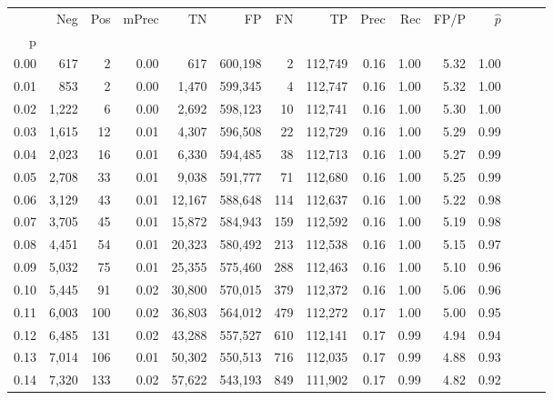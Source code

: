 \begin{tabular}{rrrrrrrrrrrrrrr}
\toprule
{} &     Neg &    Pos & mPrec &       TN &       FP &       FN &       TP &  Prec &   Rec &  FP/P & $\hat{p}$ \\
p    &         &        &       &          &          &          &          &       &       &       &           \\
\midrule
0.00 &     617 &      2 &  0.00 &      617 &  600,198 &        2 &  112,749 &  0.16 &  1.00 &  5.32 &      1.00 \\
0.01 &     853 &      2 &  0.00 &    1,470 &  599,345 &        4 &  112,747 &  0.16 &  1.00 &  5.32 &      1.00 \\
0.02 &   1,222 &      6 &  0.00 &    2,692 &  598,123 &       10 &  112,741 &  0.16 &  1.00 &  5.30 &      1.00 \\
0.03 &   1,615 &     12 &  0.01 &    4,307 &  596,508 &       22 &  112,729 &  0.16 &  1.00 &  5.29 &      0.99 \\
0.04 &   2,023 &     16 &  0.01 &    6,330 &  594,485 &       38 &  112,713 &  0.16 &  1.00 &  5.27 &      0.99 \\
0.05 &   2,708 &     33 &  0.01 &    9,038 &  591,777 &       71 &  112,680 &  0.16 &  1.00 &  5.25 &      0.99 \\
0.06 &   3,129 &     43 &  0.01 &   12,167 &  588,648 &      114 &  112,637 &  0.16 &  1.00 &  5.22 &      0.98 \\
0.07 &   3,705 &     45 &  0.01 &   15,872 &  584,943 &      159 &  112,592 &  0.16 &  1.00 &  5.19 &      0.98 \\
0.08 &   4,451 &     54 &  0.01 &   20,323 &  580,492 &      213 &  112,538 &  0.16 &  1.00 &  5.15 &      0.97 \\
0.09 &   5,032 &     75 &  0.01 &   25,355 &  575,460 &      288 &  112,463 &  0.16 &  1.00 &  5.10 &      0.96 \\
0.10 &   5,445 &     91 &  0.02 &   30,800 &  570,015 &      379 &  112,372 &  0.16 &  1.00 &  5.06 &      0.96 \\
0.11 &   6,003 &    100 &  0.02 &   36,803 &  564,012 &      479 &  112,272 &  0.17 &  1.00 &  5.00 &      0.95 \\
0.12 &   6,485 &    131 &  0.02 &   43,288 &  557,527 &      610 &  112,141 &  0.17 &  0.99 &  4.94 &      0.94 \\
0.13 &   7,014 &    106 &  0.01 &   50,302 &  550,513 &      716 &  112,035 &  0.17 &  0.99 &  4.88 &      0.93 \\
0.14 &   7,320 &    133 &  0.02 &   57,622 &  543,193 &      849 &  111,902 &  0.17 &  0.99 &  4.82 &      0.92 \\

\end{tabular}
